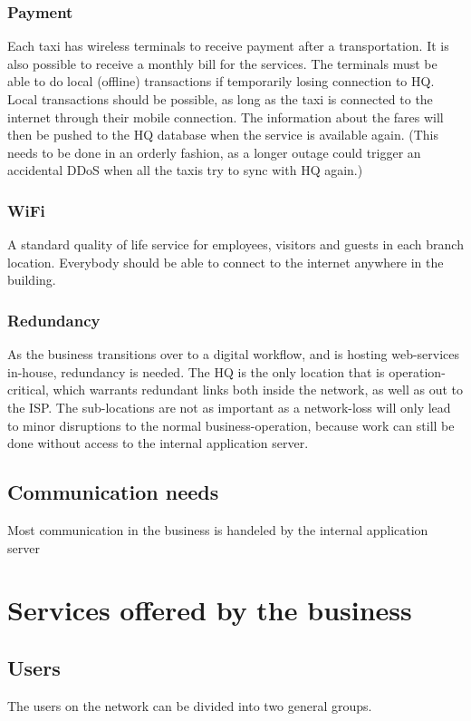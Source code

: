 \subsubsection{Payment}
Each taxi has wireless terminals to receive payment after a transportation. It is also possible to receive a monthly bill for the services. The terminals must be able to do local (offline) transactions if temporarily losing connection to HQ.
Local transactions should be possible, as long as the taxi is connected to the internet through their mobile connection. 
The information about the fares will then be pushed to the HQ database when the service is available again. (This needs to be done in an orderly fashion, as a longer outage could trigger an accidental DDoS when all the taxis try to sync with HQ again.)

\subsubsection{WiFi}
A standard quality of life service for employees, visitors and guests in each branch location. 
Everybody should be able to connect to the internet anywhere in the building.

\subsubsection{Redundancy}
As the business transitions over to a digital workflow, and is hosting web-services in-house, redundancy is needed.
The HQ is the only location that is operation-critical, which warrants redundant links both inside the network, as well as out to the ISP. 
The sub-locations are not as important as a network-loss will only lead to minor disruptions to the normal business-operation, because work can still be done without access to the internal application server.

\subsection{Communication needs}
Most communication in the business is handeled by the internal application server

\section{Services offered by the business}


\subsection{Users}
The users on the network can be divided into two general groups.

